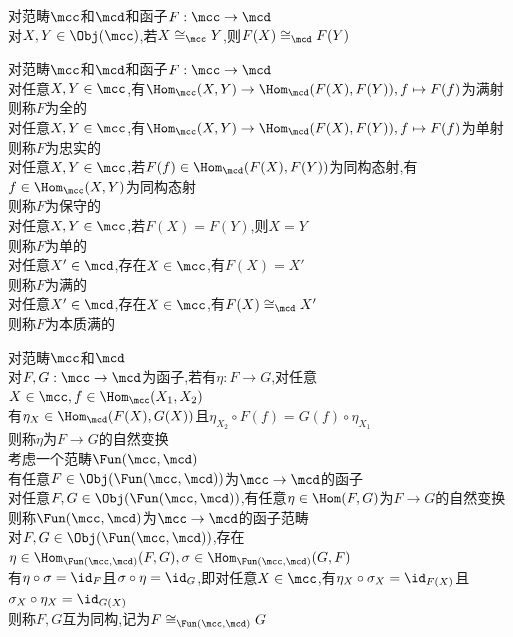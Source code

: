 \begin{dingli}
对范畴$\mcc$和$\mcd$和函子$F:\mcc\to\mcd$\\
对$X,Y\in\Obj(\mcc)$,若$X\cong_{\mcc}Y$,则$F(X)\cong_{\mcd}F(Y)$
\end{dingli}

\begin{dingyi}
对范畴$\mcc$和$\mcd$和函子$F:\mcc\to\mcd$\\
对任意$X,Y\in \mcc$,有$\Hom_{\mcc}(X,Y)\to\Hom_{\mcd}(F(X),F(Y)),f\mapsto F(f)$为满射\\
则称$F$为全的\\
对任意$X,Y\in \mcc$,有$\Hom_{\mcc}(X,Y)\to\Hom_{\mcd}(F(X),F(Y)),f\mapsto F(f)$为单射\\
则称$F$为忠实的\\
对任意$X,Y\in \mcc$,若$F(f)\in\Hom_{\mcd}(F(X),F(Y))$为同构态射,有$f\in\Hom_{\mcc}(X,Y)$为同构态射\\
则称$F$为保守的\\
对任意$X,Y\in \mcc$,若$F(X)=F(Y)$,则$X=Y$\\
则称$F$为单的\\
对任意$X'\in \mcd$,存在$X\in \mcc$,有$F(X)=X'$\\
则称$F$为满的\\
对任意$X'\in \mcd$,存在$X\in \mcc$,有$F(X)\cong_{\mcd} X'$\\
则称$F$为本质满的
\end{dingyi}

\begin{dingyi}
对范畴$\mcc$和$\mcd$\\
对$F,G:\mcc\to\mcd$为函子,若有$\eta:F\to G$,对任意$X\in\mcc,f\in\Hom_{\mcc}(X_1,X_2)$\\
有$\eta_{X}\in\Hom_{\mcd}(F(X),G(X))$且$\eta_{X_2}\circ F(f)=G(f)\circ\eta_{X_1}$\\
则称$\eta$为$F\to G$的自然变换\\
考虑一个范畴$\Fun(\mcc,\mcd)$\\
有任意$F\in\Obj(\Fun(\mcc,\mcd))$为$\mcc\to\mcd$的函子\\
对任意$F,G\in\Obj(\Fun(\mcc,\mcd))$,有任意$\eta\in\Hom(F,G)$为$F\to G$的自然变换\\
则称$\Fun(\mcc,\mcd)$为$\mcc\to \mcd$的函子范畴\\
对$F,G\in\Obj(\Fun(\mcc,\mcd))$,存在$\eta\in\Hom_{\Fun(\mcc,\mcd)}(F,G),\sigma\in\Hom_{\Fun(\mcc,\mcd)}(G,F)$\\
有$\eta\circ\sigma=\id_{F}$且$\sigma\circ\eta=\id_{G}$,即对任意$X\in\mcc$,有$\eta_{X}\circ\sigma_{X}=\id_{F(X)}$且$\sigma_{X}\circ\eta_{X}=\id_{G(X)}$\\
则称$F,G$互为同构,记为$F\cong_{\Fun(\mcc,\mcd)}G$
\end{dingyi}

